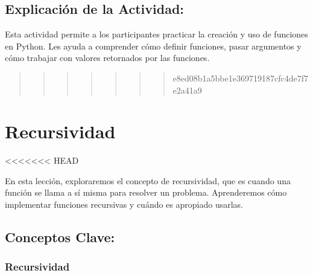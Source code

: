 \documentclass[
  a4paper,
  onepage,
  openany]{scrreprt}
\begin{document}
\hypertarget{explicaciuxf3n-de-la-actividad-43}{%
\section{Explicación de la
Actividad:}\label{explicaciuxf3n-de-la-actividad-43}}

Esta actividad permite a los participantes practicar la creación y uso
de funciones en Python. Les ayuda a comprender cómo definir funciones,
pasar argumentos y cómo trabajar con valores retornados por las
funciones.

\begin{quote}
\begin{quote}
\begin{quote}
\begin{quote}
\begin{quote}
\begin{quote}
\begin{quote}
e8ed08b1a5bbe1e369719187cfc4de7f7e2a41a9
\end{quote}
\end{quote}
\end{quote}
\end{quote}
\end{quote}
\end{quote}
\end{quote}

\hypertarget{recursividad}{%
\chapter{Recursividad}\label{recursividad}}

\textless\textless\textless\textless\textless\textless\textless{} HEAD

En esta lección, exploraremos el concepto de recursividad, que es cuando
una función se llama a sí misma para resolver un problema. Aprenderemos
cómo implementar funciones recursivas y cuándo es apropiado usarlas.

\hypertarget{conceptos-clave-46}{%
\section{Conceptos Clave:}\label{conceptos-clave-46}}

\hypertarget{recursividad-1}{%
\subsection{Recursividad}\label{recursividad-1}}
\end{document}
